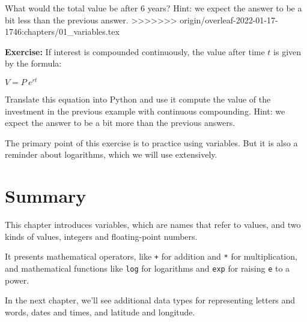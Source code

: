 What would the total value be after 6 years? Hint: we expect the answer
to be a bit less than the previous answer.
>>>>>>> origin/overleaf-2022-01-17-1746:chapters/01_variables.tex

\textbf{Exercise:} If interest is compounded continuously, the value
after time \(t\) is given by the formula:

\(V=P~e^{rt}\)

Translate this equation into Python and use it compute the value of the
investment in the previous example with continuous compounding. Hint: we
expect the answer to be a bit more than the previous answers.

The primary point of this exercise is to practice using variables. But
it is also a reminder about logarithms, which we will use extensively.

\hypertarget{summary}{%
\section{Summary}\label{summary}}

This chapter introduces variables, which are names that refer to values,
and two kinds of values, integers and floating-point numbers.

It presents mathematical operators, like \passthrough{\lstinline!+!} for
addition and \passthrough{\lstinline!*!} for multiplication, and
mathematical functions like \passthrough{\lstinline!log!} for logarithms
and \passthrough{\lstinline!exp!} for raising
\passthrough{\lstinline!e!} to a power.

In the next chapter, we'll see additional data types for representing
letters and words, dates and times, and latitude and longitude.

